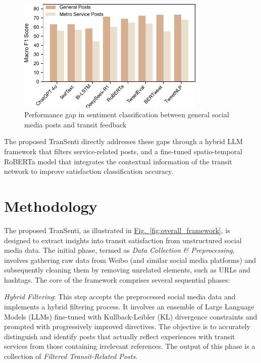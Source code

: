 \documentclass[a4paper,fleqn,12pt]{cas-sc}
\begin{document}
\begin{figure}[htbp]
\centering
\includegraphics[width=0.8\textwidth]{figs/GeneralVsSevice.pdf}
\caption{Performance gap in sentiment classification between general social media posts and transit feedback}\label{fig:GeneralVsSevice}
\end{figure}

The proposed TranSenti directly addresses these gaps through a hybrid LLM framework that filters service-related posts, and a fine-tuned spatio-temporal RoBERTa model that integrates the contextual information of the transit network to improve satisfaction classification accuracy.

\section{Methodology}\label{sec:methodology}
The proposed TranSenti, as illustrated in \hyperref[fig:overall_framework]{Fig.~\ref{fig:overall_framework}}, is designed to extract insights into transit satisfaction from unstructured social media data. The initial phase, termed as \textit{Data Collection & Preprocessing}, involves gathering raw data from Weibo (and similar social media platforms) and subsequently cleaning them by removing unrelated elements, such as URLs and hashtags. The core of the framework comprises several sequential phases:

\textit{Hybrid Filtering}: This step accepts the preprocessed social media data and implements a hybrid filtering process. It involves an ensemble of Large Language Models (LLMs) fine-tuned with Kullback-Leibler (KL) divergence constraints and prompted with progressively improved directives. The objective is to accurately distinguish and identify posts that actually reflect experiences with transit services from those containing irrelevant references. The output of this phase is a collection of \textit{Filtered Transit-Related Posts}.
\end{document}
